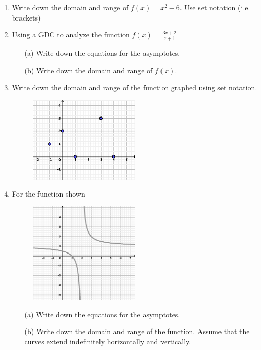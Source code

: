 \documentclass[12pt, oneside]{article}
\begin{document}
\begin{enumerate}
\item Write down the domain and range of $f(x)= x^2-6$. Use set notation (i.e. brackets)

\item Using a GDC to analyze the function $\displaystyle f(x)= \frac {3x+2}{x+1}$
\begin{itemize}
    \item[(a)] Write down the equations for the asymptotes.
	\item[(b)] Write down the domain and range of $f(x)$.
\end{itemize}

\newpage

\item Write down the domain and range of the function graphed using set notation.

\begin{figure}[!ht]
    \centering
    \includegraphics[width=0.5\textwidth]{1-4_domain.eps}
\end{figure}

\item For the function shown
\begin{figure}[!hb]
    \centering
    \includegraphics[width=0.5\textwidth]{1-4_asymptotes.eps}
\end{figure}
\begin{itemize}
    \item[(a)] Write down the equations for the asymptotes.
	\item[(b)] Write down the domain and range of the function. Assume that the curves extend indefinitely horizontally and vertically.
\end{itemize}


\end{enumerate}
\end{document}
